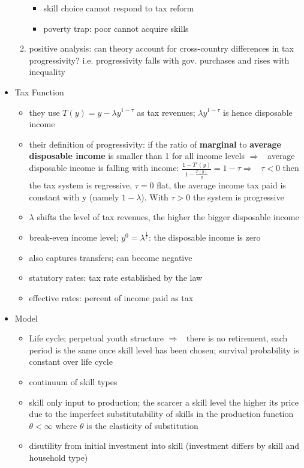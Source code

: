 \documentclass[12pt]{article}
\newcommand{\ar}{$\Rightarrow$ \ }
\begin{document}
\begin{itemize}
\begin{enumerate}
\begin{itemize}
\item skill choice cannot respond to tax reform
\item poverty trap: poor cannot acquire skills
\end{itemize}
\item positive analysis: can theory account for cross-country differences in tax progressivity? i.e. progressivity falls with gov. purchases and rises with inequality
\end{enumerate}
\item Tax Function
\begin{itemize}
\item they use $T(y)=y-\lambda y^{1-\tau}$ as tax revenues; $\lambda y^{1-\tau}$ is hence disposable income
\item their definition of progressivity: if the ratio of \textbf{marginal} to \textbf{average} \textbf{disposable income} is smaller than 1 for all income levels \ar average disposable income is falling with income:
$\frac{1-T'(y)}{1-\frac{T(y)}{y}}=1-\tau$\ar $\tau<0$ then the tax system is regressive, $\tau=0$ flat, the average income tax paid is constant with y (namely $1-\lambda$). With $\tau>0$ the system is progressive
\item $\lambda$ shifts the level of tax revenues, the higher the bigger disposable income
\item break-even income level; $y^0=\lambda^\frac{1}{\tau}$: the disposable income is zero
\item also captures transfers; can become negative
\item statutory rates: tax rate established by the law
\item effective rates: percent of income paid as tax
\end{itemize}
\item Model
\begin{itemize}
	\item Life cycle; perpetual youth structure \ar there is no retirement, each period is the same once skill level has been chosen; survival probability is constant over life cycle
	\item continuum of skill types
	\item skill only input to production; the scarcer a skill level the higher its price due to the imperfect substitutability of skills in the production function $\theta<\infty$ where $\theta$ is the elasticity of substitution
	\item disutility from initial investment into skill (investment differs by skill and household type)

\end{itemize}
\end{itemize}
\end{document}
